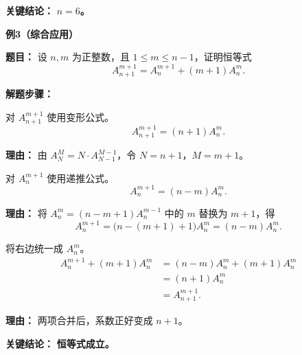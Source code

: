 \begin{examplebox}
\textbf{\textcolor{CExample}{关键结论：}} \textbf{$n=6$。}

\medskip
\textbf{\textcolor{CExample}{例3（综合应用）}}

\textbf{\textcolor{CExample}{题目：}} 设 $n,m$ 为正整数，且 $1\le m\le n-1$，证明恒等式
\[
A_{n+1}^{m+1}=A_n^{m+1}+(m+1)A_n^m.
\]

\textbf{\textcolor{CExample}{解题步骤：}}
\begin{description}[style=nextline, leftmargin=2.8em, labelsep=0.5em, itemsep=0.45em]
    \item[\textbf{第一步（转化左边）：}] 对 $A_{n+1}^{m+1}$ 使用变形公式。
    \[
    A_{n+1}^{m+1}=(n+1)A_n^m.
    \]
    \par\textbf{理由：} 由 $A_N^M=N\cdot A_{N-1}^{M-1}$，令 $N=n+1$，$M=m+1$。

    \item[\textbf{第二步（转化右边第一项）：}] 对 $A_n^{m+1}$ 使用递推公式。
    \[
    A_n^{m+1}=(n-m)A_n^m.
    \]
    \par\textbf{理由：} 将 $A_n^m=(n-m+1)A_n^{m-1}$ 中的 $m$ 替换为 $m+1$，得
    \[
    A_n^{m+1}=\bigl(n-(m+1)+1\bigr)A_n^m=(n-m)A_n^m.
    \]

    \item[\textbf{第三步（合并右边）：}] 将右边统一成 $A_n^m$。
    \[
    \begin{aligned}
    A_n^{m+1}+(m+1)A_n^m
    &=(n-m)A_n^m+(m+1)A_n^m\\
    &=(n+1)A_n^m\\
    &=A_{n+1}^{m+1}.
    \end{aligned}
    \]
    \par\textbf{理由：} 两项合并后，系数正好变成 $n+1$。
\end{description}

\textbf{\textcolor{CExample}{关键结论：}} \textbf{恒等式成立。}
\end{examplebox}
